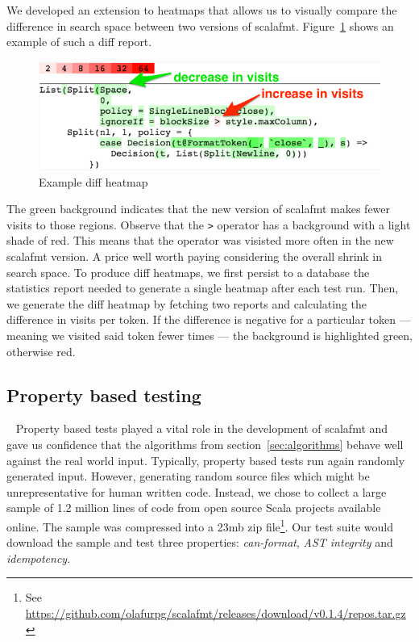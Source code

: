 We developed an extension to heatmaps that allows us to visually compare the difference in search space between two versions of scalafmt.
Figure~\ref{fig:heatmap2} shows an example of such a diff report.
\begin{figure}
  \centering
  \includegraphics[width=\textwidth]{img/heatmap2-annot.png}
  \caption{Example diff heatmap}
  \label{fig:heatmap2}
\end{figure}
The green background indicates that the new version of scalafmt makes fewer visits to those regions.
Observe that the \texttt{>} operator has a background with a light shade of red.
This means that the operator was visisted more often in the new scalafmt version.
A price well worth paying considering the overall shrink in search space.
To produce diff heatmaps, we first persist to a database the statistics report needed to generate a single heatmap after each test run.
Then, we generate the diff heatmap by fetching two reports and calculating the difference in visits per token.
If the difference is negative for a particular token --- meaning we visited said token fewer times --- the background is highlighted green, otherwise red.

\subsection{Property based testing}~\label{sec:testing}
Property based tests played a vital role in the development of scalafmt and gave us confidence that the algorithms from section~\ref{sec:algorithms} behave well against the real world input.
Typically, property based tests run again randomly generated input.
However, generating random source files which might be unrepresentative for human written code.
Instead, we chose to collect a large sample of 1.2 million lines of code from open source Scala projects available online.
The sample was compressed into a 23mb zip file\footnote{See \url{https://github.com/olafurpg/scalafmt/releases/download/v0.1.4/repos.tar.gz}}.
Our test suite would download the sample and test three properties: \emph{can-format}, \emph{AST integrity} and \emph{idempotency}.

